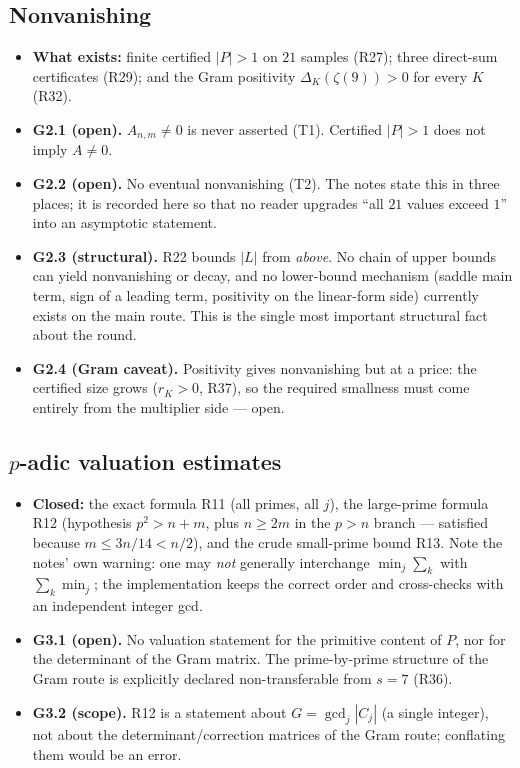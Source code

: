\documentclass[11pt]{article}
\begin{document}
\subsection{Nonvanishing}
\begin{itemize}[leftmargin=1.4em]
\item \textbf{What exists:} finite certified $|P|>1$ on $21$ samples (R27); three direct-sum certificates
      (R29); and the Gram positivity $\Delta_K(\zeta(9))>0$ for every $K$ (R32).
\item \textbf{G2.1 (open).} $A_{n,m}\ne0$ is never asserted (T1). Certified $|P|>1$ does not imply $A\ne0$.
\item \textbf{G2.2 (open).} No eventual nonvanishing (T2). The notes state this in three places; it is
      recorded here so that no reader upgrades ``all $21$ values exceed $1$'' into an asymptotic statement.
\item \textbf{G2.3 (structural).} R22 bounds $|L|$ from \emph{above}. No chain of upper bounds can
      yield nonvanishing or decay, and no lower-bound mechanism (saddle main term, sign of a leading
      term, positivity on the linear-form side) currently exists on the main route. This is the single
      most important structural fact about the round.
\item \textbf{G2.4 (Gram caveat).} Positivity gives nonvanishing but at a price: the certified size
      grows ($r_K>0$, R37), so the required smallness must come entirely from the multiplier side --- open.
\end{itemize}

\subsection{$p$-adic valuation estimates}
\begin{itemize}[leftmargin=1.4em]
\item \textbf{Closed:} the exact formula R11 (all primes, all $j$), the large-prime formula R12
      (hypothesis $p^{2}>n+m$, plus $n\ge2m$ in the $p>n$ branch --- satisfied because $m\le3n/14<n/2$),
      and the crude small-prime bound R13. Note the notes' own warning: one may \emph{not} generally
      interchange $\min_j\sum_k$ with $\sum_k\min_j$; the implementation keeps the correct order and
      cross-checks with an independent integer gcd.
\item \textbf{G3.1 (open).} No valuation statement for the primitive content of $P$, nor for the
      determinant of the Gram matrix. The prime-by-prime structure of the Gram route is explicitly
      declared non-transferable from $s=7$ (R36).
\item \textbf{G3.2 (scope).} R12 is a statement about $G=\gcd_j|C_j|$ (a single integer), not about the
      determinant/correction matrices of the Gram route; conflating them would be an error.
\end{itemize}
\end{document}
